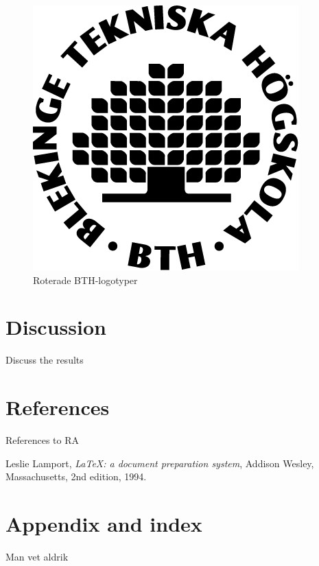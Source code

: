 \documentclass[a4paper]{article}
\begin{document}
\begin{figure}[h]
\includegraphics[scale=0.7, angle=60]{bth_logo.jpg}
\caption{Roterade BTH-logotyper}
\label{fig:Logo}
\end{figure}

\section{Discussion}
Discuss the results

\section{References}
References to RA
\begin{thebibliography}{9}

  Leslie Lamport,
  \textit{\LaTeX: a document preparation system},
  Addison Wesley, Massachusetts,
  2nd edition,
  1994.

\end{thebibliography}

\section{Appendix and index}
Man vet aldrik
\end{document}
